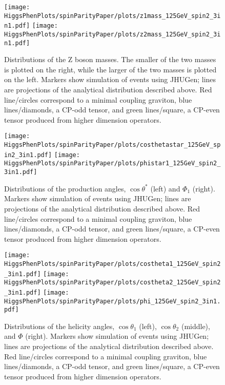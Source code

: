 \begin{figure}
\begin{center}
\texttt{[image: HiggsPhenPlots/spinParityPaper/plots/z1mass\_125GeV\_spin2\_3in1.pdf]}
\texttt{[image: HiggsPhenPlots/spinParityPaper/plots/z2mass\_125GeV\_spin2\_3in1.pdf]}
\label{fig:TensorMasses}
\caption{Distributions of the Z boson masses.  The smaller of the two masses is
plotted on the right, while the larger of the two masses is plotted on the
left. Markers show simulation of events using JHUGen; lines are projections
of the analytical distribution described above.  Red line/circles correspond
to a minimal coupling graviton, blue lines/diamonds, a CP-odd tensor, 
and green lines/square, 
a CP-even tensor produced from higher dimension operators.}
\end{center}
\end{figure}

\begin{figure}
\begin{center}
\texttt{[image: HiggsPhenPlots/spinParityPaper/plots/costhetastar\_125GeV\_spin2\_3in1.pdf]}
\texttt{[image: HiggsPhenPlots/spinParityPaper/plots/phistar1\_125GeV\_spin2\_3in1.pdf]}
\label{fig:TensorProdAngles}
\caption{Distributions of the production angles, $\cos\theta^*$ (left) and
$\Phi_1$ (right). Markers show simulation of events using JHUGen; lines
are projections
of the analytical distribution described above.  Red line/circles correspond
to a minimal coupling graviton, blue lines/diamonds, a CP-odd tensor, 
and green lines/square, 
a CP-even tensor produced from higher dimension operators.}
\end{center}
\end{figure}

\begin{figure}
\begin{center}
\texttt{[image: HiggsPhenPlots/spinParityPaper/plots/costheta1\_125GeV\_spin2\_3in1.pdf]}
\texttt{[image: HiggsPhenPlots/spinParityPaper/plots/costheta2\_125GeV\_spin2\_3in1.pdf]}
\texttt{[image: HiggsPhenPlots/spinParityPaper/plots/phi\_125GeV\_spin2\_3in1.pdf]}
\label{fig:TensorHelicityAngles}
\caption{Distributions of the helicity angles, $\cos\theta_1$ (left), 
$\cos\theta_2$ (middle), and $\Phi$ (right). Markers show simulation of 
events using JHUGen; lines are projections
of the analytical distribution described above.  Red line/circles correspond
to a minimal coupling graviton, blue lines/diamonds, a CP-odd tensor, 
and green lines/square, 
a CP-even tensor produced from higher dimension operators.}
\end{center}
\end{figure}


